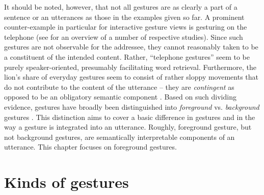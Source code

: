 \documentclass[output=paper]{langsci/langscibook}
\begin{document}
It should be noted, however, that not all gestures are as clearly a part of a sentence or an utterances as those in the examples given so far.
%
A prominent counter-example in particular for interactive gesture views is gesturing on the telephone (see \citet{Bavelas:Gerwing:Sutton:Prevost:2008} for an overview of a number of respective studies).
%
Since such gestures are not observable for the addressee, they cannot reasonably taken to be a constituent of the intended content. 
%
Rather, \enquote{telephone gestures} seem to be purely speaker-oriented, presumably facilitating word retrieval.
%
Furthermore, the lion's share of everyday gestures seem to consist of rather sloppy movements that do not contribute to the content of the utterance -- they are \emph{contingent} as opposed to be an obligatory semantic component \citep{Luecking:2013:a}.
%
Based on such dividing evidence, gestures have broadly been distinguished into \emph{foreground}  vs. \emph{background} gestures  \citep{Cooperrider:2017}. 
%
This distinction aims to cover a basic difference in gestures and in the way a gesture is integrated into an utterance. 
%
Roughly, foreground gesture, but not background gestures, are semantically interpretable components of an utterance.
%
This chapter focuses on foreground gestures.


\section{Kinds of gestures}
\label{sec:kinds-gestures}
\end{document}
